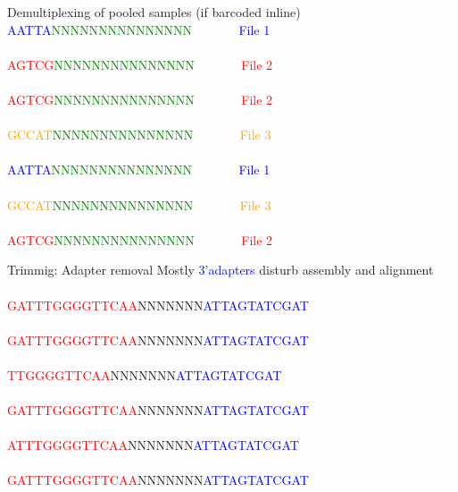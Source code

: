 \documentclass[presentation]{beamer}
\begin{document}
\begin{frame}[label=sec-2-1-2]{Demultiplexing of pooled samples (if barcoded inline)}
\textcolor{blue}{AATTA}\textcolor{green}{NNNNNNNNNNNNNNN}\textcolor{white}{XXXXX}\textcolor{blue}{File 1}\\
\textcolor{white}{}\\
\textcolor{red}{AGTCG}\textcolor{green}{NNNNNNNNNNNNNNN}\textcolor{white}{XXXXX}\textcolor{red}{File 2}\\
\textcolor{white}{}\\
\textcolor{red}{AGTCG}\textcolor{green}{NNNNNNNNNNNNNNN}\textcolor{white}{XXXXX}\textcolor{red}{File 2}\\
\textcolor{white}{}\\
\textcolor{orange}{GCCAT}\textcolor{green}{NNNNNNNNNNNNNNN}\textcolor{white}{XXXXX}\textcolor{orange}{File 3}\\
\textcolor{white}{}\\
\textcolor{blue}{AATTA}\textcolor{green}{NNNNNNNNNNNNNNN}\textcolor{white}{XXXXX}\textcolor{blue}{File 1}\\
\textcolor{white}{}\\
\textcolor{orange}{GCCAT}\textcolor{green}{NNNNNNNNNNNNNNN}\textcolor{white}{XXXXX}\textcolor{orange}{File 3}\\
\textcolor{white}{}\\
\textcolor{red}{AGTCG}\textcolor{green}{NNNNNNNNNNNNNNN}\textcolor{white}{XXXXX}\textcolor{red}{File 2}\\
\end{frame}

\begin{frame}[label=sec-2-1-3]{Trimmig: Adapter removal}
Mostly \textcolor{blue}{3'adapters} disturb assembly and alignment
\textcolor{white}{dd}\\
\textcolor{white}{dd}\\
\textcolor{red}{GATTTGGGGTTCAA}NNNNNNN\textcolor{blue}{ATTAGTATCGAT}\\
\textcolor{white}{}\\
\textcolor{red}{GATTTGGGGTTCAA}NNNNNNN\textcolor{blue}{ATTAGTATCGAT}\\
\textcolor{white}{}\\
\textcolor{red}{TTGGGGTTCAA}NNNNNNN\textcolor{blue}{ATTAGTATCGAT}\\
\textcolor{white}{}\\
\textcolor{red}{GATTTGGGGTTCAA}NNNNNNN\textcolor{blue}{ATTAGTATCGAT}\\
\textcolor{white}{}\\
\textcolor{red}{ATTTGGGGTTCAA}NNNNNNN\textcolor{blue}{ATTAGTATCGAT}\\
\textcolor{white}{}\\
\textcolor{red}{GATTTGGGGTTCAA}NNNNNNN\textcolor{blue}{ATTAGTATCGAT}\\
\textcolor{white}{}\\
\end{frame}
\end{document}
